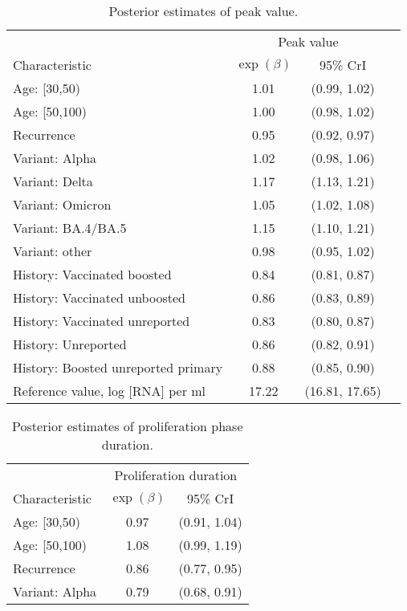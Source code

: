 \begin{appendix}
    \begin{table}[p]
        \centering
        \caption{Posterior estimates of peak value.}
        \begin{tabular}{lccc}
        \toprule
         & \multicolumn{2}{c}{Peak value} \\
        Characteristic & $\exp(\beta)$ & 95\% CrI\\
        \midrule
         Age: [30,50) & 1.01 & (0.99, 1.02)\\
         Age: [50,100) & 1.00 & (0.98, 1.02)\\
         Recurrence & 0.95 & (0.92, 0.97)\\
         Variant: Alpha & 1.02 & (0.98, 1.06)\\
         Variant: Delta & 1.17 & (1.13, 1.21)\\
         Variant: Omicron & 1.05 & (1.02, 1.08)\\
         Variant: BA.4/BA.5 & 1.15 & (1.10, 1.21)\\
         Variant: other & 0.98 & (0.95, 1.02)\\
         History: Vaccinated boosted & 0.84 & (0.81, 0.87)\\
         History: Vaccinated unboosted & 0.86 & (0.83, 0.89)\\
         History: Vaccinated unreported & 0.83 & (0.80, 0.87)\\
         History: Unreported & 0.86 & (0.82, 0.91)\\
         History: Boosted unreported primary & 0.88 & (0.85, 0.90)\\
         \midrule
         Reference value, log [RNA] per ml & 17.22 & (16.81, 17.65)\\
         \bottomrule
        \end{tabular}
    \end{table}
    \begin{table}[p]
        \caption{Posterior estimates of proliferation phase duration.}
        \centering
        \begin{tabular}{lcc}
         \toprule
         & \multicolumn{2}{c}{Proliferation duration } \\
         Characteristic & $\exp(\beta)$ & 95\% CrI\\
         \midrule
         Age: [30,50) & 0.97 & (0.91, 1.04)\\
         Age: [50,100) & 1.08 & (0.99, 1.19)\\
         Recurrence & 0.86 & (0.77, 0.95)\\
         Variant: Alpha & 0.79 & (0.68, 0.91)\\

\end{tabular}
\end{table}
\end{appendix}
